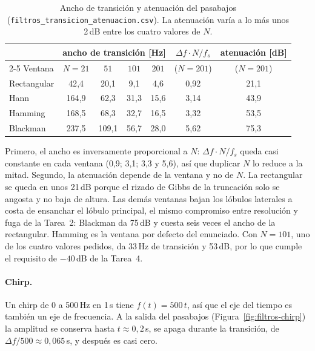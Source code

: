 \begin{table}[htbp]
  \centering
  \small
  \begin{tabular}{lcccccc}
    \toprule
    & \multicolumn{4}{c}{ancho de transición [Hz]} & $\Delta f\cdot N/f_s$ & atenuación [dB] \\
    \cmidrule(lr){2-5}
    Ventana & $N=21$ & $51$ & $101$ & $201$ & ($N=201$) & ($N=201$) \\
    \midrule
    Rectangular & 42{,}4  & 20{,}1  & 9{,}1  & 4{,}6  & 0{,}92 & 21{,}1 \\
    Hann        & 164{,}9 & 62{,}3  & 31{,}3 & 15{,}6 & 3{,}14 & 43{,}9 \\
    Hamming     & 168{,}5 & 68{,}3  & 32{,}7 & 16{,}5 & 3{,}32 & 53{,}5 \\
    Blackman    & 237{,}5 & 109{,}1 & 56{,}7 & 28{,}0 & 5{,}62 & 75{,}3 \\
    \bottomrule
  \end{tabular}
  \caption{Ancho de transición y atenuación del pasabajos
    (\texttt{filtros\_transicion\_atenuacion.csv}). La atenuación varía a lo más unos 2\,dB entre los
    cuatro valores de $N$.}
  \label{tab:filtros}
\end{table}

Primero, el ancho es inversamente proporcional a $N$: $\Delta f\cdot N/f_s$ queda casi constante
en cada ventana (0{,}9; 3{,}1; 3{,}3 y 5{,}6), así que duplicar $N$ lo reduce a la mitad. Segundo,
la atenuación depende de la ventana y no de $N$. La rectangular se queda en unos 21\,dB porque el
rizado de Gibbs de la truncación solo se angosta y no baja de altura. Las demás ventanas bajan los
lóbulos laterales a costa de ensanchar el lóbulo principal, el mismo compromiso entre resolución
y fuga de la Tarea~2: Blackman da 75\,dB y cuesta seis veces el ancho de la rectangular. Hamming
es la ventana por defecto del enunciado. Con $N=101$, uno de los cuatro valores pedidos, da 33\,Hz
de transición y 53\,dB, por lo que cumple el requisito de $-40$\,dB de la Tarea~4.

\paragraph{Chirp.}
Un chirp de 0 a 500\,Hz en 1\,s tiene $f(t)=500\,t$, así que el eje del tiempo es también un eje
de frecuencia. A la salida del pasabajos (Figura~\ref{fig:filtros-chirp}) la amplitud se conserva
hasta $t\approx0{,}2$\,s, se apaga durante la transición, de $\Delta f/500\approx0{,}065$\,s, y
después es casi cero.

